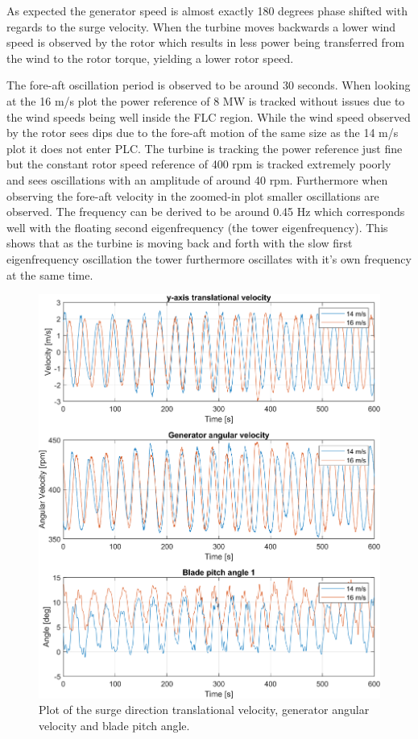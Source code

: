 As expected the generator speed is almost exactly 180 degrees phase shifted with regards to the surge velocity. When the turbine moves backwards a lower wind speed is observed by the rotor which results in less power being transferred from the wind to the rotor torque, yielding a lower rotor speed.

The fore-aft oscillation period is observed to be around 30 seconds. When looking at the 16 m/s plot the power reference of 8 MW is tracked without issues due to the wind speeds being well inside the FLC region. While the wind speed observed by the rotor sees dips due to the fore-aft motion of the same size as the 14 m/s plot it does not enter PLC. The turbine is tracking the power reference just fine but the constant rotor speed reference of 400 rpm is tracked extremely poorly and sees oscillations with an amplitude of around 40 rpm. Furthermore when observing the fore-aft velocity in the zoomed-in plot smaller oscillations are observed. The frequency can be derived to be around 0.45 Hz which corresponds well with the floating second eigenfrequency (the tower eigenfrequency). This shows that as the turbine is moving back and forth with the slow first eigenfrequency oscillation the tower furthermore oscillates with it's own frequency at the same time.
\begin{figure}[ht]
	\centering
	\includegraphics[width=0.8\linewidth]{Graphics/TestResults/tj02/uykf_omgen_pi1.png}
	\caption{Plot of the surge direction translational velocity, generator angular velocity and blade pitch angle.}
	\label{fig:tj02_uykf_to_pi1}
\end{figure}
